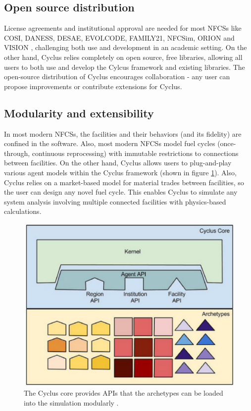 \subsection{Open source distribution}
License agreements and institutional
approval are needed for most \glspl{NFCS} like COSI, DANESS, DESAE, EVOLCODE,
FAMILY21, NFCSim, ORION and VISION \cite{jacobson_verifiable_2010}, challenging
both use and development in an academic setting.
On the other hand, Cyclus relies completely on open source,
free libraries, allowing all users to both use and develop the
Cylcus framework and existing libraries. The open-source distribution
of Cyclus encourages collaboration - any user can propose
improvements or contribute extensions for Cyclus.

\subsection{Modularity and extensibility}
In most modern \glspl{NFCS}, the facilities and their
behaviors (and its fidelity) are confined in the software.
Also, most modern \glspl{NFCS} model
fuel cycles (once-through, continuous reprocessing)
with immutable restrictions to connections between facilities. On the
other hand, Cyclus allows users to plug-and-play various agent models
within the Cyclus framework (shown in figure \ref{fig:core}).
Also, Cyclus relies on a market-based model
for material trades between facilities, so the user can design
any novel fuel cycle. This enables Cyclus to simulate any system analysis
involving multiple connected facilities with physics-based
calculations.


\begin{figure}[htbp!]
	\begin{center}
		\includegraphics[scale=0.3]{./images/cyclus_core.png}
	\end{center}
	\caption{The Cyclus core provides APIs that the archetypes
			can be loaded into the simulation modularly
			\cite{huff_fundamental_2016}.}
	\label{fig:core}
\end{figure}


